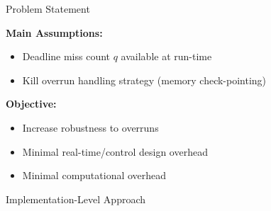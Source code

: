 
\begin{frame}{Problem Statement}

    \textbf{Main Assumptions:}
    \begin{itemize}
        \item Deadline miss count $q$ available at run-time
        \item Kill overrun handling strategy (memory check-pointing)
    \end{itemize}

    \textbf{Objective:}
    \begin{itemize}
        \item Increase robustness to overruns
        \item Minimal real-time/control design overhead
        \item Minimal computational overhead
    \end{itemize}
\end{frame}

\begin{frame}{Implementation-Level Approach}
    \begin{figure}
        \centerline{}
    \end{figure}
\end{frame}

